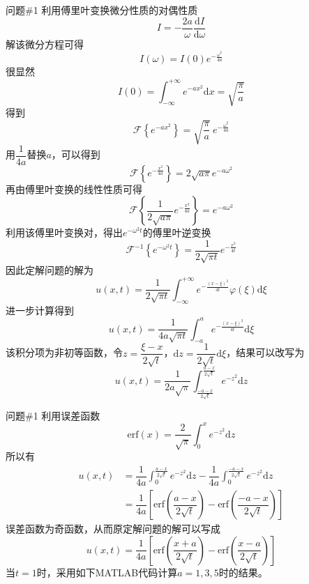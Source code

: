 \documentclass[12pt]{ctexart}
\begin{document}
    \begin{problem}{问题\#1}
        利用傅里叶变换微分性质的对偶性质
        $$
        I=-\dfrac{2a}{\omega}\dfrac{\text{d}I}{\text{d}\omega}
        $$
        解该微分方程可得
        $$
        I(\omega)=I(0)e^{-\frac{\omega^2}{4a}}
        $$
        很显然
        $$
        I(0)=\int^{+\infty}_{-\infty}e^{-ax^2}\text{d}x=\sqrt{\dfrac{\pi}{a}}
        $$
        得到
        $$
        \mathscr{F}\left\{e^{-ax^2}\right\}=\sqrt{\dfrac{\pi}{a}}\ e^{-\frac{\omega^2}{4a}}
        $$
        用$\dfrac{1}{4a}$替换$a$，可以得到
        $$
        \mathscr{F}\left\{e^{-\frac{x^2}{4a}}\right\}=2\sqrt{a\pi}e^{-a\omega^2}
        $$
        再由傅里叶变换的线性性质可得
        $$
        \mathscr{F}\left\{\dfrac{1}{2\sqrt{a\pi}}e^{-\frac{x^2}{4a}}\right\}=e^{-a\omega^2}
        $$
        利用该傅里叶变换对，得出$e^{-\omega^2t}$的傅里叶逆变换
        $$
        \mathscr{F}^{-1}\left\{e^{-\omega^2t}\right\}=\dfrac{1}{2\sqrt{\pi t}}e^{-\frac{x^2}{4t}}
        $$
        因此定解问题的解为
        $$
        u(x,t)=\dfrac{1}{2\sqrt{\pi t}}\int^{+\infty}_{-\infty}e^{-\frac{(x-\xi)^2}{4t}}\varphi(\xi)\text{d}\xi
        $$
        进一步计算得到
        $$
        u(x,t)=\dfrac{1}{4a\sqrt{\pi t}}
        \int^{a}_{-a}e^{-\frac{(x-\xi)^2}{4t}}\text{d}\xi
        $$
        该积分项为非初等函数，令$z=\dfrac{\xi-x}{2\sqrt{t}}$，$\text{d}z=\dfrac{1}{2\sqrt{t}}\text{d}\xi$，结果可以改写为
        $$
        u(x,t)=\dfrac{1}{2a\sqrt{\pi}}\int^{\frac{a-x}{2\sqrt{t}}}_{\frac{-a-x}{2\sqrt{t}}}e^{-z^2}\text{d}z
        $$
    \end{problem}
    \begin{problem}{问题\#1}
        利用误差函数
        $$
        \text{erf}(x)=\dfrac{2}{\sqrt{\pi}}\int^{x}_{0}e^{-z^2}\text{d}z
        $$
        所以有
        $$
        \begin{aligned}
            u(x,t)&=\dfrac{1}{4a}\int^{\frac{a-x}{2\sqrt{t}}}_{0}e^{-z^2}\text{d}z-\dfrac{1}{4a}\int^{\frac{-a-x}{2\sqrt{t}}}_{0}e^{-z^2}\text{d}z\\
            &=\dfrac{1}{4a}\left[
                \text{erf}\left(\dfrac{a-x}{2\sqrt{t}}\right)- \text{erf}\left(\dfrac{-a-x}{2\sqrt{t}}\right)
            \right]
        \end{aligned}
        $$
        误差函数为奇函数，从而原定解问题的解可以写成
        $$
        u(x,t)=\dfrac{1}{4a}\left[
            \text{erf}\left(\dfrac{x+a}{2\sqrt{t}}\right)- \text{erf}\left(\dfrac{x-a}{2\sqrt{t}}\right)\right]
        $$
        当$t=1$时，采用如下MATLAB代码计算$a=1,3,5$时的结果。
    \end{problem}
\end{document}
